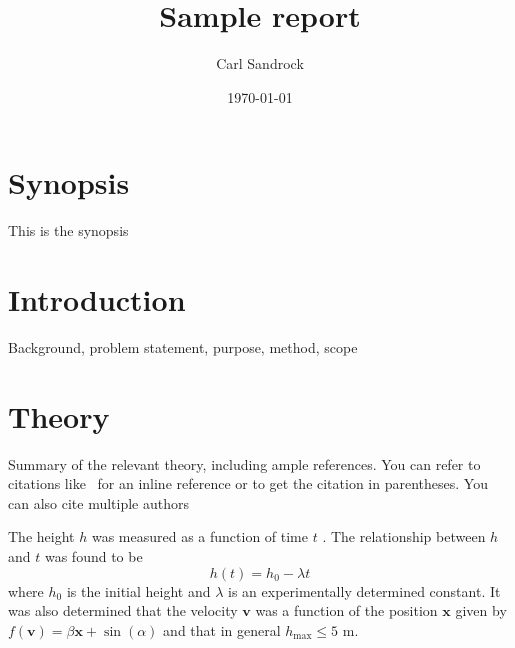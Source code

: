 \documentclass[a4paper,12pt]{article}
\title{Sample report}
\author{Carl Sandrock}
\date{\today}
\newcommand{\nomunit}[1]{%
\renewcommand{\nomentryend}{\hspace*{\fill}#1}}
\begin{document}
\maketitle
\makecoverpage

\pagestyle{plain}
\thispagestyle{plain}

\begin{center}
\LARGE\textbf{\thetitle}
\end{center}

\section*{Synopsis}
%
This is the synopsis
\newpage
\tableofcontents
\newpage
\listoffigures
\newpage
\listoftables
\newpage
\printnomenclature
\newpage

\pagestyle{plain}
\setcounter{page}{1}

\section{Introduction}
Background, problem statement, purpose, method, scope

\section{Theory}
Summary of the relevant theory, including ample references. You can refer to citations like~\citep{bruckmanmandersloot} for an inline reference or \citep{bruckmanmandersloot} to get the citation in parentheses. You can also cite multiple authors~\citep{mandersloot,bruckmanmandersloot}

The height $h$ \nomenclature{h}{Height \nomunit{m}} was measured as a function of time $t$ \nomenclature{t}{time \nomunit{s}}.  The relationship between $h$ and $t$ was found to be 
\begin{equation}
  \label{eq:commaexample}
  h(t) = h_0 - \lambda t
\end{equation}
where $h_0$ is the initial height and $\lambda$ is an experimentally
determined constant.  It was also determined that the velocity
$\mathbf{v}$ was a function of the position $\mathbf{x}$ given by
$f(\mathbf{v}) = \beta \mathbf{x} + \sin(\alpha)$ and that in general
$h_{\mathrm{max}} \leq 5$ m.
\end{document}
